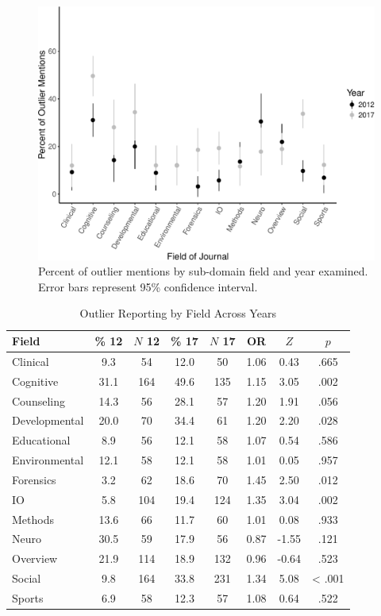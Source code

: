 \documentclass[english,man]{apa6}
\theoremstyle{definition}
\theoremstyle{definition}
\theoremstyle{definition}
\theoremstyle{remark}
\begin{document}
\begin{figure}
\centering
\includegraphics{outliers_manuscript_files/figure-latex/type-graph-1.pdf}
\caption{\label{fig:type-graph}Percent of outlier mentions by sub-domain
field and year examined. Error bars represent 95\% confidence interval.}
\end{figure}

\begin{table}[tbp]
\begin{center}
\begin{threeparttable}
\caption{\label{tab:info-table}Outlier Reporting by Field Across Years}
\begin{tabular}{lccccccc}
\toprule
Field & \% 12 & $N$ 12 & \% 17 & $N$ 17 & OR & $Z$ & $p$\\
\midrule
Clinical & 9.3 & 54 & 12.0 & 50 & 1.06 & 0.43 & .665\\
Cognitive & 31.1 & 164 & 49.6 & 135 & 1.15 & 3.05 & .002\\
Counseling & 14.3 & 56 & 28.1 & 57 & 1.20 & 1.91 & .056\\
Developmental & 20.0 & 70 & 34.4 & 61 & 1.20 & 2.20 & .028\\
Educational & 8.9 & 56 & 12.1 & 58 & 1.07 & 0.54 & .586\\
Environmental & 12.1 & 58 & 12.1 & 58 & 1.01 & 0.05 & .957\\
Forensics & 3.2 & 62 & 18.6 & 70 & 1.45 & 2.50 & .012\\
IO & 5.8 & 104 & 19.4 & 124 & 1.35 & 3.04 & .002\\
Methods & 13.6 & 66 & 11.7 & 60 & 1.01 & 0.08 & .933\\
Neuro & 30.5 & 59 & 17.9 & 56 & 0.87 & -1.55 & .121\\
Overview & 21.9 & 114 & 18.9 & 132 & 0.96 & -0.64 & .523\\
Social & 9.8 & 164 & 33.8 & 231 & 1.34 & 5.08 & < .001\\
Sports & 6.9 & 58 & 12.3 & 57 & 1.08 & 0.64 & .522\\
\bottomrule
\end{tabular}
\end{threeparttable}
\end{center}
\end{table}
\end{document}

